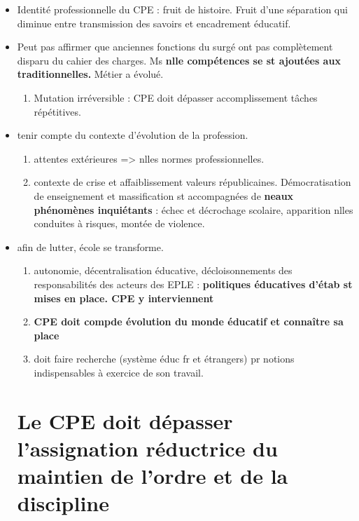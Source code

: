 \documentclass[12pt]{report}
\begin{document}
\begin{itemize}

\item Identité professionnelle du CPE : fruit de histoire. Fruit d'une séparation qui diminue entre transmission des savoirs et encadrement éducatif.\\

\item Peut pas affirmer que anciennes fonctions du surgé ont pas complètement disparu du cahier des charges. Ms \textbf{nlle compétences se st ajoutées aux traditionnelles.} Métier a évolué.
\begin{enumerate}
\item  Mutation irréversible : CPE doit dépasser accomplissement tâches répétitives. \\
\end{enumerate}

\item tenir compte du contexte d'évolution de la profession. 
\begin{enumerate}
\item attentes extérieures => nlles normes professionnelles. \\
\item contexte de crise et affaiblissement valeurs républicaines. Démocratisation de enseignement et massification st accompagnées de \textbf{neaux phénomènes inquiétants} : échec et décrochage scolaire, apparition nlles conduites à risques, montée de violence. \\
\end{enumerate}

\item afin de lutter, école se transforme.
\begin{enumerate}
\item autonomie, décentralisation éducative, décloisonnements des responsabilités des acteurs des EPLE : \textbf{politiques éducatives d'étab st mises en place. CPE y interviennent} \\

\item \textbf{CPE doit compde évolution du monde éducatif et connaître sa place} \\

\item doit faire recherche (système éduc fr et étrangers) pr notions indispensables à exercice de son travail.
\end{enumerate}

\section{Le CPE doit dépasser l'assignation réductrice du maintien de l'ordre et de la discipline}


\end{itemize}
\end{document}
